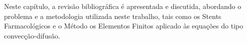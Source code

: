 Neste capítulo, a revisão bibliográfica é
apresentada e discutida, abordando o problema
e a metodologia utilizada neste trabalho,
tais como os Stents Farmacológicos e o Método
os Elementos Finitos aplicado às equações do tipo
convecção-difusão.

